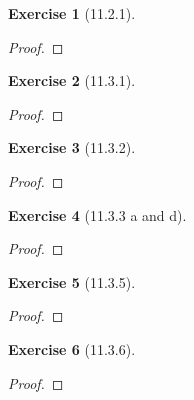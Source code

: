 \documentclass[12pt]{article}
\newtheorem*{exer}{Exercise}
\begin{document}

\begin{exer}[11.2.1]
\end{exer}

\begin{proof}
\end{proof}


\begin{exer}[11.3.1]
\end{exer}

\begin{proof}
\end{proof}


\begin{exer}[11.3.2]
\end{exer}

\begin{proof}
\end{proof}


\begin{exer}[11.3.3 a and d]
\end{exer}

\begin{proof}
\end{proof}


\begin{exer}[11.3.5]
\end{exer}

\begin{proof}
\end{proof}


\begin{exer}[11.3.6]
\end{exer}

\begin{proof}
\end{proof}

\end{document}
